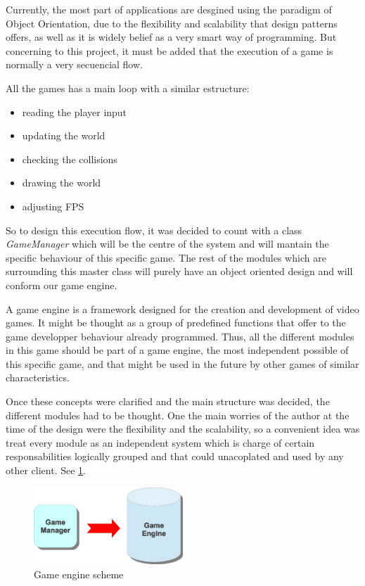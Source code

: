 \documentclass[]{article}
\begin{document}
Currently, the most part of applications are desgined using the paradigm of Object Orientation, due to the flexibility and scalability that design patterns offers, as well as it is widely belief
as a very smart way of programming. But concerning to this project, it must be added that the execution of a game is normally a very secuencial flow.

All the games has a main loop with a similar estructure:
\begin{itemize}
 \item reading the player input
 \item updating the world
 \item checking the collisions
 \item drawing the world
 \item adjusting FPS
\end{itemize}

So to design this execution flow, it was decided to count with a class \emph{GameManager} which will be the centre of the system and will mantain the specific behaviour of this specific game. 
The rest of the modules which are surrounding this master class will purely have an object oriented design and will conform our game engine.

A game engine is a framework designed for the creation and development of video games. It might be thought as a group of predefined functions that offer to the game developper behaviour
already programmed. Thus, all the different modules in this game should be part of a game engine, the most independent possible of this specific game, and that might be used in the future by
other games of similar characteristics.

Once these concepts were clarified and the main structure was decided, the different modules had to be thought. One the main worries of the author at the time of the design were the flexibility
and the scalability, so a convenient idea was treat every module as an independent system which is charge of certain responsabilities logically grouped and that could unacoplated and used by any
other client. See \ref{fig:ge}.

\begin{figure}[h]
\begin{center}
\includegraphics[width=0.5\textwidth]{images/gameEngine.eps}
\caption{Game engine scheme}
\label{fig:ge}
\end{center}
\end{figure}
\end{document}

